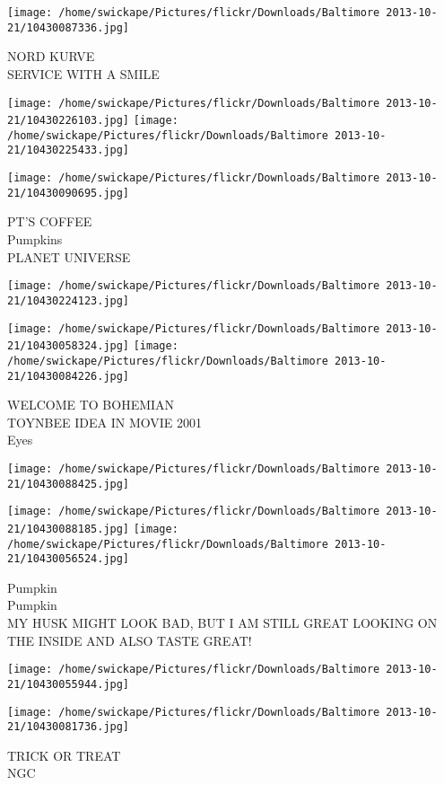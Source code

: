 \documentclass[10pt,letterpaper]{article}
\begin{document}
\vspace{0.25in}
\texttt{[image: /home/swickape/Pictures/flickr/Downloads/Baltimore 2013-10-21/10430087336.jpg]}

NORD KURVE\\
SERVICE WITH A SMILE
\pagebreak

\texttt{[image: /home/swickape/Pictures/flickr/Downloads/Baltimore 2013-10-21/10430226103.jpg]}
\texttt{[image: /home/swickape/Pictures/flickr/Downloads/Baltimore 2013-10-21/10430225433.jpg]}

\texttt{[image: /home/swickape/Pictures/flickr/Downloads/Baltimore 2013-10-21/10430090695.jpg]}

PT'S COFFEE\\
Pumpkins\\
PLANET UNIVERSE
\pagebreak

\texttt{[image: /home/swickape/Pictures/flickr/Downloads/Baltimore 2013-10-21/10430224123.jpg]}

\vspace{0.25in}
\texttt{[image: /home/swickape/Pictures/flickr/Downloads/Baltimore 2013-10-21/10430058324.jpg]}
\texttt{[image: /home/swickape/Pictures/flickr/Downloads/Baltimore 2013-10-21/10430084226.jpg]}

WELCOME TO BOHEMIAN\\
TOYNBEE IDEA IN MOVIE 2001\\
Eyes
\pagebreak

\texttt{[image: /home/swickape/Pictures/flickr/Downloads/Baltimore 2013-10-21/10430088425.jpg]}

\vspace{0.25in}
\texttt{[image: /home/swickape/Pictures/flickr/Downloads/Baltimore 2013-10-21/10430088185.jpg]}
\texttt{[image: /home/swickape/Pictures/flickr/Downloads/Baltimore 2013-10-21/10430056524.jpg]}

Pumpkin\\
Pumpkin\\
MY HUSK MIGHT LOOK BAD, BUT I AM STILL GREAT LOOKING ON THE INSIDE AND ALSO TASTE GREAT!
\pagebreak

\texttt{[image: /home/swickape/Pictures/flickr/Downloads/Baltimore 2013-10-21/10430055944.jpg]}

\vspace{0.25in}
\texttt{[image: /home/swickape/Pictures/flickr/Downloads/Baltimore 2013-10-21/10430081736.jpg]}

TRICK OR TREAT\\
NGC
\pagebreak
\end{document}
